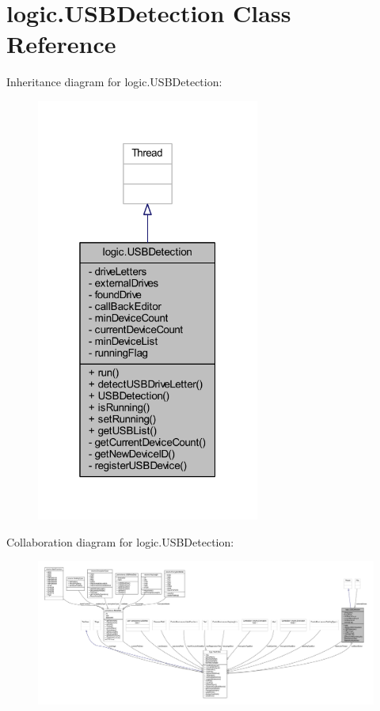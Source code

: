 \hypertarget{classlogic_1_1_u_s_b_detection}{}\section{logic.\+U\+S\+B\+Detection Class Reference}
\label{classlogic_1_1_u_s_b_detection}


Inheritance diagram for logic.\+U\+S\+B\+Detection\+:\nopagebreak
\begin{figure}[H]
\begin{center}
\leavevmode
\includegraphics[width=208pt]{classlogic_1_1_u_s_b_detection__inherit__graph}
\end{center}
\end{figure}


Collaboration diagram for logic.\+U\+S\+B\+Detection\+:\nopagebreak
\begin{figure}[H]
\begin{center}
\leavevmode
\includegraphics[width=350pt]{classlogic_1_1_u_s_b_detection__coll__graph}
\end{center}
\end{figure}
